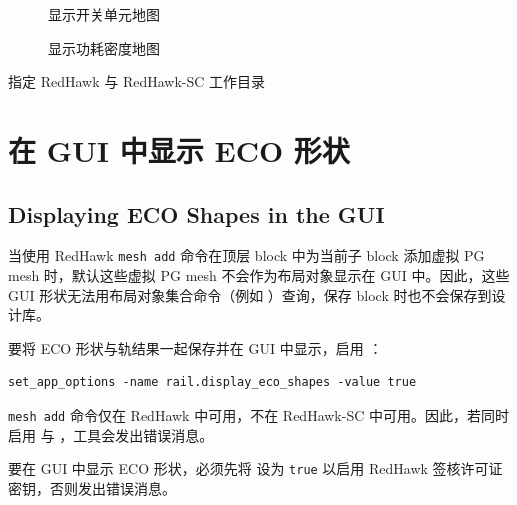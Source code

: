 \begin{figure}[htbp]
\centering
{}
\caption{显示开关单元地图}
\label{fig:switch-map}
\end{figure}

\begin{figure}[htbp]
\centering
{}
\caption{显示功耗密度地图}
\label{fig:power-dens}
\end{figure}

\begin{seeAlsoBox}
指定 RedHawk 与 RedHawk-SC 工作目录
\end{seeAlsoBox}

\section{在 GUI 中显示 ECO 形状}
\subsection*{Displaying ECO Shapes in the GUI}

当使用 RedHawk \texttt{mesh add} 命令在顶层 block 中为当前子 block 添加虚拟 PG mesh 时，默认这些虚拟 PG mesh 不会作为布局对象显示在 GUI 中。因此，这些 GUI 形状无法用布局对象集合命令（例如 ）查询，保存 block 时也不会保存到设计库。

要将 ECO 形状与轨结果一起保存并在 GUI 中显示，启用 ：
\begin{lstlisting}
set_app_options -name rail.display_eco_shapes -value true
\end{lstlisting}

\begin{noteBox}
\texttt{mesh add} 命令仅在 RedHawk 中可用，不在 RedHawk-SC 中可用。因此，若同时启用  与 ，工具会发出错误消息。

要在 GUI 中显示 ECO 形状，必须先将  设为 \texttt{true} 以启用 RedHawk 签核许可证密钥，否则发出错误消息。
\end{noteBox}

